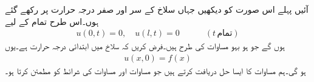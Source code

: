 آئیں پہلے اس صورت کو دیکھیں جہاں سلاخ کے سر  اور  صفر درجہ حرارت پر رکھے گئے ہوں۔اس طرح  تمام  کے لیے 
\begin{align}\label{مساوات_جزوی_حراری_ب}
u(0,t)=0,\quad u(l,t)=0\quad \quad \quad (t\,\text{تمام})
\end{align}
ہوں گے جو ہو بہو مساوات  کی طرح ہیں۔فرض کریں کہ سلاخ میں ابتدائی درجہ حرارت  ہے۔یوں 
\begin{align}\label{مساوات_جزوی_حراری_پ}
u(x,0)=f(x)
\end{align}
ہو گی۔ہم مساوات  کا ایسا حل  دریافت کرتے ہیں جو مساوات  اور مساوات  کی شرائط کو  مطمئن کرتا ہو۔

